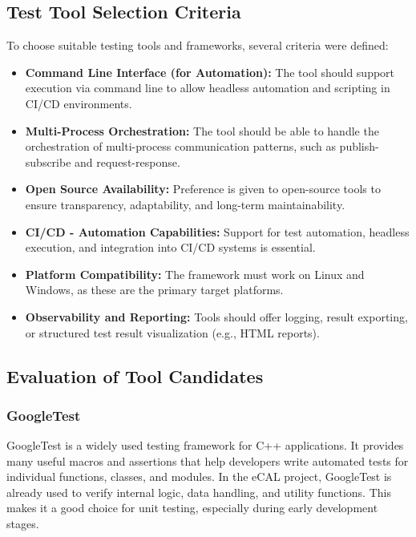 \subsection{Test Tool Selection Criteria}

To choose suitable testing tools and frameworks, several criteria were defined:

\begin{itemize}
	\item \textbf{Command Line Interface (for Automation):} The tool should support execution via command line to allow headless automation and scripting in CI/CD environments.
	\item \textbf{Multi-Process Orchestration:} The tool should be able to handle the orchestration of multi-process communication patterns, such as publish-subscribe and request-response.
	\item \textbf{Open Source Availability:} Preference is given to open-source tools to ensure transparency, adaptability, and long-term maintainability.
	\item \textbf{CI/CD - Automation Capabilities:} Support for test automation, headless execution, and integration into CI/CD systems is essential.
	\item \textbf{Platform Compatibility:} The framework must work on Linux and Windows, as these are the primary target platforms.
	\item \textbf{Observability and Reporting:} Tools should offer logging, result exporting, or structured test result visualization (e.g., HTML reports).

\end{itemize}

\subsection{Evaluation of Tool Candidates}

\subsubsection*{GoogleTest}

GoogleTest is a widely used testing framework for C++ applications. It provides many useful macros and assertions that help developers write automated tests for individual functions, classes, and modules. In the eCAL project, GoogleTest is already used to verify internal logic, data handling, and utility functions. This makes it a good choice for unit testing, especially during early development stages.

